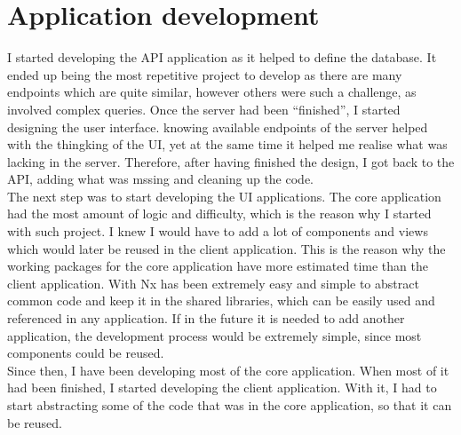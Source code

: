 \documentclass[a4paper, 12pt, oneside]{book}
\begin{document}
\section{Application development}
I started developing the API application as it helped to define the database. It ended up being the most repetitive project to develop as there are many endpoints which are quite similar, however others were such a challenge, as involved complex queries. Once the server had been ``finished'', I started designing the user interface. knowing available endpoints of the server helped with the thingking of the UI, yet at the same time it helped me realise what was lacking in the server. Therefore, after having finished the design, I got back to the API, adding what was mssing and cleaning up the code.
\\[8pt]
The next step was to start developing the UI applications. The core application had the most amount of logic and difficulty, which is the reason why I started with such project. I knew I would have to add a lot of components and views which would later be reused in the client application. This is the reason why the working packages for the core application have more estimated time than the client application. With Nx has been extremely easy and simple to abstract common code and keep it in the shared libraries, which can be easily used and referenced in any application. If in the future it is needed to add another application, the development process would be extremely simple, since most components could be reused.
\\[8pt]
Since then, I have been developing most of the core application. When most of it had been finished, I started developing the client application. With it, I had to start abstracting some of the code that was in the core application, so that it can be reused.
\end{document}
